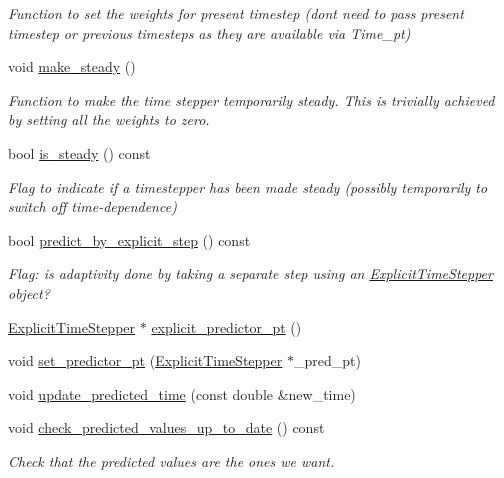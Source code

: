 \begin{DoxyCompactItemize}
\begin{DoxyCompactList}\small\item\em Function to set the weights for present timestep (don\textquotesingle{}t need to pass present timestep or previous timesteps as they are available via Time\+\_\+pt) \end{DoxyCompactList}\item 
void \hyperlink{classoomph_1_1TimeStepper_a81ea0ff2e66cef5e0184b616c608e418}{make\+\_\+steady} ()
\begin{DoxyCompactList}\small\item\em Function to make the time stepper temporarily steady. This is trivially achieved by setting all the weights to zero. \end{DoxyCompactList}\item 
bool \hyperlink{classoomph_1_1TimeStepper_ad341ba9e80265e1c26c1cda0f40c8292}{is\+\_\+steady} () const
\begin{DoxyCompactList}\small\item\em Flag to indicate if a timestepper has been made steady (possibly temporarily to switch off time-\/dependence) \end{DoxyCompactList}\item 
bool \hyperlink{classoomph_1_1TimeStepper_abf0f84ac9e7c1266dea9bd9e479fb2bf}{predict\+\_\+by\+\_\+explicit\+\_\+step} () const
\begin{DoxyCompactList}\small\item\em Flag\+: is adaptivity done by taking a separate step using an \hyperlink{classoomph_1_1ExplicitTimeStepper}{Explicit\+Time\+Stepper} object? \end{DoxyCompactList}\item 
\hyperlink{classoomph_1_1ExplicitTimeStepper}{Explicit\+Time\+Stepper} $\ast$ \hyperlink{classoomph_1_1TimeStepper_ab570dfd6a22d73079599a97d462de9ef}{explicit\+\_\+predictor\+\_\+pt} ()
\item 
void \hyperlink{classoomph_1_1TimeStepper_affb7d9405e9b8cfbd108082faa0c74e4}{set\+\_\+predictor\+\_\+pt} (\hyperlink{classoomph_1_1ExplicitTimeStepper}{Explicit\+Time\+Stepper} $\ast$\+\_\+pred\+\_\+pt)
\item 
void \hyperlink{classoomph_1_1TimeStepper_ab9813c8ea8ad981f0db9a467302b9cd0}{update\+\_\+predicted\+\_\+time} (const double \&new\+\_\+time)
\item 
void \hyperlink{classoomph_1_1TimeStepper_a385e522bb6b5c6109e20e860b70e9b6b}{check\+\_\+predicted\+\_\+values\+\_\+up\+\_\+to\+\_\+date} () const
\begin{DoxyCompactList}\small\item\em Check that the predicted values are the ones we want. \end{DoxyCompactList}\item 

\end{DoxyCompactItemize}

